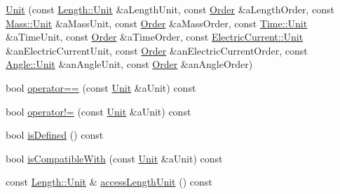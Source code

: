 \begin{DoxyCompactItemize}
\item 
\hyperlink{classlibrary_1_1physics_1_1units_1_1_derived_1_1_unit_ab68c758223d70f32011fb674ae57c77e}{Unit} (const \hyperlink{classlibrary_1_1physics_1_1units_1_1_length_a3b8b39cd245cf6b19dc34459baeccb18}{Length\+::\+Unit} \&a\+Length\+Unit, const \hyperlink{classlibrary_1_1physics_1_1units_1_1_derived_1_1_order}{Order} \&a\+Length\+Order, const \hyperlink{classlibrary_1_1physics_1_1units_1_1_mass_a95f1e0434bc16794926b8e273bc2a54b}{Mass\+::\+Unit} \&a\+Mass\+Unit, const \hyperlink{classlibrary_1_1physics_1_1units_1_1_derived_1_1_order}{Order} \&a\+Mass\+Order, const \hyperlink{classlibrary_1_1physics_1_1units_1_1_time_ab876a6a05c9a2f28905f2753bfd64109}{Time\+::\+Unit} \&a\+Time\+Unit, const \hyperlink{classlibrary_1_1physics_1_1units_1_1_derived_1_1_order}{Order} \&a\+Time\+Order, const \hyperlink{classlibrary_1_1physics_1_1units_1_1_electric_current_a9498eabf964f0ae6116eb627b4ec5233}{Electric\+Current\+::\+Unit} \&an\+Electric\+Current\+Unit, const \hyperlink{classlibrary_1_1physics_1_1units_1_1_derived_1_1_order}{Order} \&an\+Electric\+Current\+Order, const \hyperlink{classlibrary_1_1physics_1_1units_1_1_angle_a3c329d415a61783b16ce481874cc5956}{Angle\+::\+Unit} \&an\+Angle\+Unit, const \hyperlink{classlibrary_1_1physics_1_1units_1_1_derived_1_1_order}{Order} \&an\+Angle\+Order)
\item 
bool \hyperlink{classlibrary_1_1physics_1_1units_1_1_derived_1_1_unit_a207d8431c78316e5fd209ebb9441775f}{operator==} (const \hyperlink{classlibrary_1_1physics_1_1units_1_1_derived_1_1_unit}{Unit} \&a\+Unit) const
\item 
bool \hyperlink{classlibrary_1_1physics_1_1units_1_1_derived_1_1_unit_abe02f07604a605c6f9c526599328bf37}{operator!=} (const \hyperlink{classlibrary_1_1physics_1_1units_1_1_derived_1_1_unit}{Unit} \&a\+Unit) const
\item 
bool \hyperlink{classlibrary_1_1physics_1_1units_1_1_derived_1_1_unit_adc1896bc12e75e2e8a08eb06cdcac434}{is\+Defined} () const
\item 
bool \hyperlink{classlibrary_1_1physics_1_1units_1_1_derived_1_1_unit_a44a173b22d6c9c26bfbbc4291cd00cc8}{is\+Compatible\+With} (const \hyperlink{classlibrary_1_1physics_1_1units_1_1_derived_1_1_unit}{Unit} \&a\+Unit) const
\item 
const \hyperlink{classlibrary_1_1physics_1_1units_1_1_length_a3b8b39cd245cf6b19dc34459baeccb18}{Length\+::\+Unit} \& \hyperlink{classlibrary_1_1physics_1_1units_1_1_derived_1_1_unit_a39a4cbff8b3e4347a4744e788198ad4d}{access\+Length\+Unit} () const

\end{DoxyCompactItemize}
